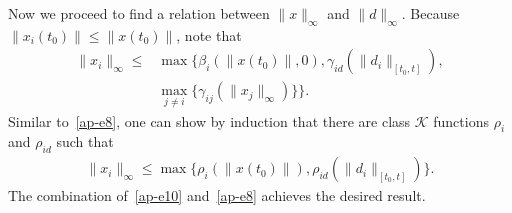 \documentclass[journal]{IEEEtran}
\begin{document}
\begin{IEEEproof}
\begin{IEEEproof}
Now we proceed to find a relation between $\|x\|_{\infty}$ and $\|d\|_{\infty}$.
Because $\|x_i(t_0)\|\leq \|x(t_0)\|$, note that
\begin{align*}\|x_i\|_{\infty}\leq &\max\{\beta_i(\|x(t_0)\|,0),\gamma_{id}(\|d_i\|_{[t_0,t]}),\\
&\max_{j\neq i}\{\gamma_{ij}(\|x_j\|_{\infty})\}\}.
\end{align*}
Similar to~\eqref{ap-e8}, one can show by induction that there are class $\mathcal{K}$ functions $\rho_i$ and $\rho_{id}$ such that
\begin{align}
\|x_i\|_{\infty}\leq \max\{\rho_i(\|x(t_0)\|),\rho_{id}(\|d_i\|_{[t_0,t]})\}.
\label{ap-e10}
\end{align}
The combination of~\eqref{ap-e10} and~\eqref{ap-e8} achieves the desired result. \end{IEEEproof}


\end{IEEEproof}
\end{document}

